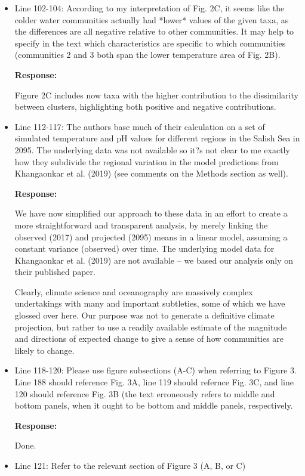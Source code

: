 \documentclass[11pt]{article}
\begin{document}
\begin{linenumbers}
\begin{itemize}
\item{Line 102-104: According to my interpretation of Fig. 2C, it seems like the colder water communities actually had *lower* values of the given taxa, as the differences are all negative relative to other communities. It may help to specify in the text which characteristics are specific to which communities (communities 2 and 3 both span the lower temperature area of Fig. 2B).}

\textbf{Response:}
 
 Figure 2C includes now taxa with the higher contribution to the dissimilarity between clusters, highlighting both positive and negative contributions. 


\item{Line 112-117: The authors base much of their calculation on a set of simulated temperature and pH values for different regions in the Salish Sea in 2095. The underlying data was not available so it?s not clear to me exactly how they subdivide the regional variation in the model predictions from Khangaonkar et al. (2019) (see comments on the Methods section as well).}

\textbf{Response:}

We have now simplified our approach to these data in an effort to create a more straightforward and transparent analysis, by merely linking the observed (2017) and projected (2095) means in a linear model, assuming a constant variance (observed) over time. The underlying model data for Khangaonkar et al. (2019) are not available -- we based our analysis only on their published paper. 

Clearly, climate science and oceanography are massively complex undertakings with many and important subtleties, some of which we have glossed over here. Our purpose was not to generate a definitive climate projection, but rather to use a readily available estimate of the magnitude and directions of expected change to give a sense of how communities are likely to change. 

\item{Line 118-120: Please use figure subsections (A-C) when referring to Figure 3. Line 188 should reference Fig. 3A, line 119 should refernce Fig. 3C, and line 120 should reference Fig. 3B (the text erroneously refers to middle and bottom panels, when it ought to be bottom and middle panels, respectively.}

\textbf{Response:}

Done.

\item{Line 121: Refer to the relevant section of Figure 3 (A, B, or C)}


\end{itemize}
\end{linenumbers}
\end{document}
